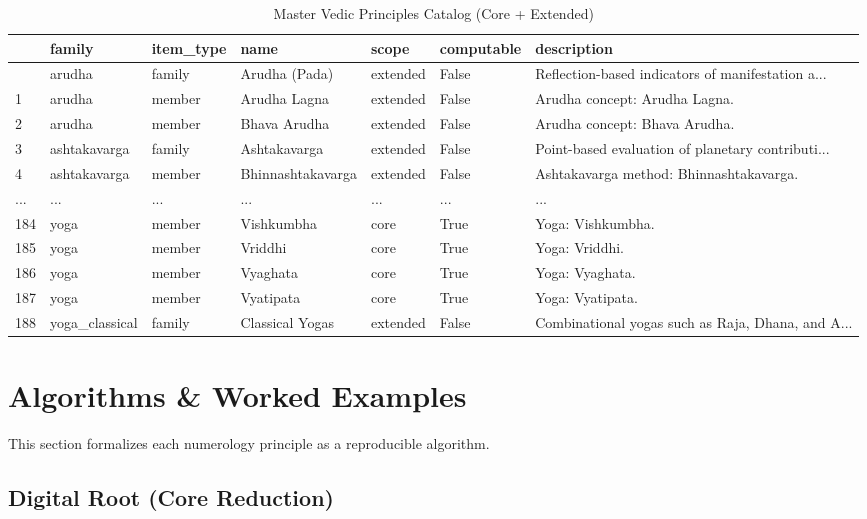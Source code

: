 \documentclass[
  11pt,
  a4paper,
  oneside,
  openany]{article}
\begin{document}
\begin{longtable}[]{@{}lllllll@{}}

\caption{\label{tbl-num-vedic-master}Master Vedic Principles Catalog
(Core + Extended)}

\tabularnewline

\toprule\noalign{}
& family & item\_type & name & scope & computable & description \\
\midrule\noalign{}
\endhead
\bottomrule\noalign{}
\endlastfoot
0 & arudha & family & Arudha (Pada) & extended & False &
Reflection-based indicators of manifestation a... \\
1 & arudha & member & Arudha Lagna & extended & False & Arudha concept:
Arudha Lagna. \\
2 & arudha & member & Bhava Arudha & extended & False & Arudha concept:
Bhava Arudha. \\
3 & ashtakavarga & family & Ashtakavarga & extended & False &
Point-based evaluation of planetary contributi... \\
4 & ashtakavarga & member & Bhinnashtakavarga & extended & False &
Ashtakavarga method: Bhinnashtakavarga. \\
... & ... & ... & ... & ... & ... & ... \\
184 & yoga & member & Vishkumbha & core & True & Yoga: Vishkumbha. \\
185 & yoga & member & Vriddhi & core & True & Yoga: Vriddhi. \\
186 & yoga & member & Vyaghata & core & True & Yoga: Vyaghata. \\
187 & yoga & member & Vyatipata & core & True & Yoga: Vyatipata. \\
188 & yoga\_classical & family & Classical Yogas & extended & False &
Combinational yogas such as Raja, Dhana, and A... \\

\end{longtable}

\section{Algorithms \& Worked
Examples}\label{algorithms-worked-examples}

This section formalizes each numerology principle as a reproducible
algorithm.

\subsection{Digital Root (Core
Reduction)}\label{digital-root-core-reduction}
\end{document}
